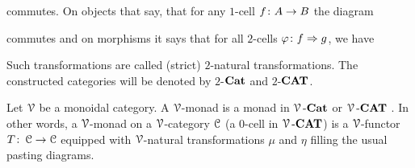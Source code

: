 \documentclass[a4paper,11pt,oneside,openany]{scrbook}
\begin{document}
\begin{exmp}
\begin{center}
       \end{center}
    commutes. On objects that say, that for any $1$-cell $f \colon A \to B$ the diagram 
       \begin{center}
       \end{center}
    commutes and on morphisms it says that for all $2$-cells $\varphi \colon f \Rightarrow g$, we have 
       \begin{center}
       \end{center}
    Such transformations are called (strict) $2$-natural transformations. The constructed categories will be denoted by $2$-${\normalfont\textbf{Cat}}$ and $2$-${\normalfont\textbf{CAT}}$.
\end{exmp}

\begin{defn}
Let $\operatorname{\mathcal{V}}$ be a monoidal category. A $\operatorname{\mathcal{V}}$-monad is a monad in $\operatorname{\mathcal{V}}\mbox{-}{\normalfont\textbf{Cat}}$ or $\operatorname{\mathcal{V}}\mbox{-}{\normalfont\textbf{CAT}}$%
. In other words, a $\operatorname{\mathcal{V}}$-monad on a $\operatorname{\mathcal{V}}$-category $\operatorname{\mathcal{C}}$ (a $0$-cell in $\operatorname{\mathcal{V}}\mbox{-}{\normalfont\textbf{CAT}}$) is a $\operatorname{\mathcal{V}}$-functor $T\colon\operatorname{\mathcal{C}}\to\operatorname{\mathcal{C}}$ equipped with $\operatorname{\mathcal{V}}$-natural transformations $\mu$ and $\eta$ filling the usual pasting diagrams.
\end{defn}    
\end{document}
